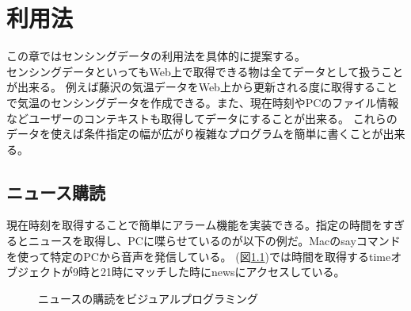 \chapter{利用法}
\label{chap:usage}
この章ではセンシングデータの利用法を具体的に提案する。\\
センシングデータといってもWeb上で取得できる物は全てデータとして扱うことが出来る。
例えば藤沢の気温データをWeb上から更新される度に取得することで気温のセンシングデータを作成できる。また、現在時刻やPCのファイル情報などユーザーのコンテキストも取得してデータにすることが出来る。
これらのデータを使えば条件指定の幅が広がり複雑なプログラムを簡単に書くことが出来る。

\section{ニュース購読}
現在時刻を取得することで簡単にアラーム機能を実装できる。指定の時間をすぎるとニュースを取得し、PCに喋らせているのが以下の例だ。Macのsayコマンドを使って特定のPCから音声を発信している。
(図\ref{fig:image10})では時間を取得するtimeオブジェクトが9時と21時にマッチした時にnewsにアクセスしている。
\begin{figure}[htbp]
  \begin{center}
  \end{center}
  \caption{ニュースの購読をビジュアルプログラミング}
  \label{fig:image10}
\end{figure}

